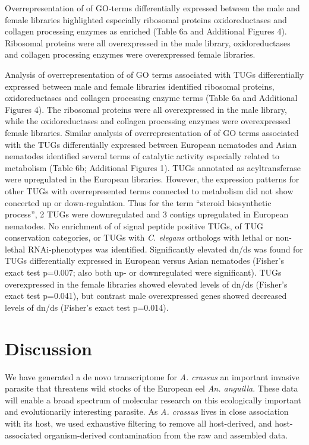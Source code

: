 \documentclass[10pt]{bmc_article}
\newenvironment{bmcformat}{\begin{raggedright}\baselineskip20pt\sloppy\setboolean{publ}{false}}{\end{raggedright}\baselineskip20pt\sloppy}
\begin{document}
\begin{bmcformat}
Overrepresentation of of GO-terms differentially expressed between the
male and female libraries highlighted especially ribosomal proteins
oxidoreductases and collagen processing enzymes as enriched (Table 6a
and Additional Figures 4). Ribosomal proteins were all overexpressed
in the male library, oxidoreductases and collagen processing enzymes
were overexpressed female libraries.

Analysis of overrepresentation of of GO terms associated with TUGs
differentially expressed between male and female libraries identified
ribosomal proteins, oxidoreductases and collagen processing enzyme
terms (Table 6a and Additional Figures 4). The ribosomal proteins were
all overexpressed in the male library, while the oxidoreductases and
collagen processing enzymes were overexpressed female
libraries. Similar analysis of overrepresentation of of GO terms
associated with the TUGs differentially expressed between European
nematodes and Asian nematodes identified several terms of catalytic
activity especially related to metabolism (Table 6b; Additional
Figures 1). TUGs annotated as acyltransferase were upregulated in the
European libraries. However, the expression patterns for other TUGs
with overrepresented terms connected to metabolism did not show
concerted up or down-regulation. Thus for the term ``steroid
biosynthetic process'', 2 TUGs were downregulated and 3 contigs
upregulated in European nematodes. No enrichment of of signal peptide
positive TUGs, of TUG conservation categories, or TUGs with
\textit{C. elegans} orthologs with lethal or non-lethal
RNAi-phenotypes was identified. Significantly elevated dn/ds was found
for TUGs differentially expressed in European versus Asian nematodes
(Fisher's exact test p=0.007; also both up- or downregulated were
significant). TUGs overexpressed in the female libraries showed
elevated levels of dn/ds (Fisher's exact test p=0.041), but contrast
male overexpressed genes showed decreased levels of dn/ds (Fisher's
exact test p=0.014).


\section*{Discussion}

We have generated a de novo transcriptome for \textit{A. crassus} an
important invasive parasite that threatens wild stocks of the European
eel \textit{An. anguilla}. These data will enable a broad spectrum of
molecular research on this ecologically important and evolutionarily
interesting parasite. As \textit{A. crassus} lives in close
association with its host, we used exhaustive filtering to remove all
host-derived, and host-associated organism-derived contamination from
the raw and assembled data.


\end{bmcformat}
\end{document}
